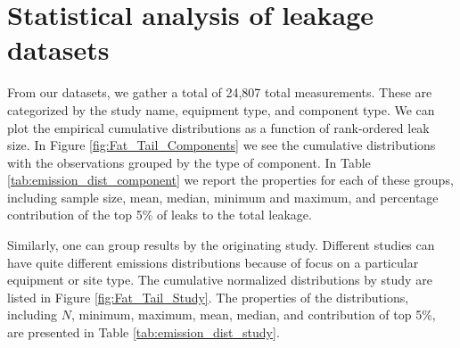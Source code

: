 \documentclass[11pt]{report}
\begin{document}
{{{{\section{Statistical analysis of leakage datasets}

From our datasets, we gather a total of 24,807 total measurements. These are categorized by the study name, equipment type, and component type. We can plot the empirical cumulative distributions as a function of rank-ordered leak size. In Figure \ref{fig:Fat_Tail_Components} we see the cumulative distributions with the observations grouped by the type of component.  In Table \ref{tab:emission_dist_component} we report the properties for each of these groups, including sample size, mean, median, minimum and maximum, and percentage contribution of the top 5\% of leaks to the total leakage.

Similarly, one can group results by the originating study. Different studies can have quite different emissions distributions because of focus on a particular equipment or site type. The cumulative normalized distributions by study are listed in Figure \ref{fig:Fat_Tail_Study}. The properties of the distributions, including $N$, minimum, maximum, mean, median, and contribution of top 5\%, are presented in Table \ref{tab:emission_dist_study}.


}}}}
\end{document}
